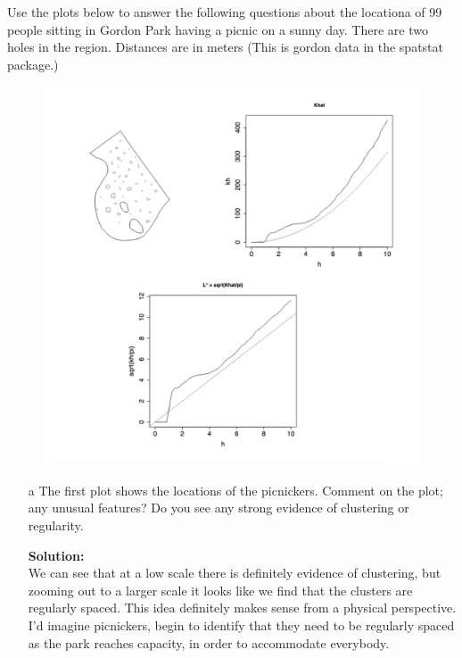 \documentclass[12pt]{article}
\makeatletter
\theoremstyle{homework}
\newenvironment{exercise}[1]
{\def\@currentlabel{#1}\exercisecore}
{\endexercisecore}
\newcommand{\localhead}[1]{\par\smallskip\noindent\textbf{#1}\nobreak\\}%
\newcommand\solution{\localhead{Solution:}}
\makeatother
\begin{document}
\begin{exercise}{5} Use the plots below to answer the following questions about the locationa of 99 people sitting in Gordon Park having a picnic on a sunny day. There are two holes 
  in the region. Distances are in meters (This is gordon data in the spatstat package.)\\
  \begin{figure}[H]
    \begin{center}
    \includegraphics[width = .6\textwidth]{kfunction.png}
    \end{center}
  \end{figure} 








  \begin{enumerate}
    \item[a] The first plot shows the locations of the picnickers. Comment on the plot; any unusual features? Do you see any strong evidence of clustering or regularity.\\
    \solution We can see that at a low scale there is definitely evidence of clustering, but zooming out to a larger scale it looks like we find that the clusters are regularly spaced. This idea definitely makes sense 
    from a physical perspective. I'd imagine picnickers, begin to identify that they need to be regularly spaced as the park reaches capacity, in order to accommodate everybody.  
    \vspace{.15in}
    

\end{enumerate}
\end{exercise}
\end{document}
